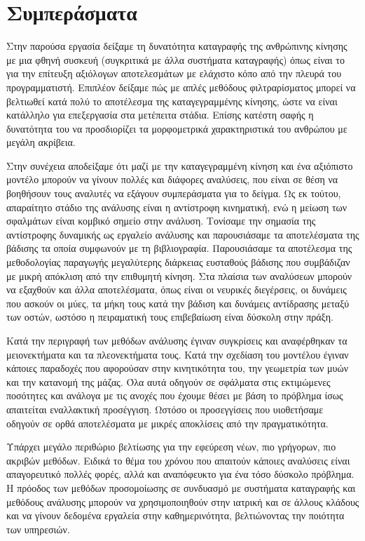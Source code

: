 \section{Συμπεράσματα}

Στην παρούσα εργασία δείξαμε τη δυνατότητα καταγραφής της ανθρώπινης κίνησης με μια φθηνή συσκευή (συγκριτικά με άλλα συστήματα καταγραφής) όπως είναι το  για την επίτευξη αξιόλογων αποτελεσμάτων με ελάχιστο κόπο από την πλευρά του προγραμματιστή. Επιπλέον δείξαμε πώς με απλές μεθόδους φιλτραρίσματος μπορεί να βελτιωθεί κατά πολύ το αποτέλεσμα της καταγεγραμμένης κίνησης, ώστε να είναι κατάλληλο για επεξεργασία στα μετέπειτα στάδια. Επίσης κατέστη σαφής η δυνατότητα του  να προσδιορίζει τα μορφομετρικά χαρακτηριστικά του ανθρώπου με μεγάλη ακρίβεια.

Στην συνέχεια αποδείξαμε ότι μαζί με την καταγεγραμμένη κίνηση και ένα αξιόπιστο μοντέλο μπορούν να γίνουν πολλές και διάφορες αναλύσεις, που είναι σε θέση να βοηθήσουν τους αναλυτές να εξάγουν συμπεράσματα για το δείγμα. Ως εκ τούτου, απαραίτητο στάδιο της ανάλυσης είναι η αντίστροφη κινηματική, ενώ η μείωση των σφαλμάτων είναι κομβικό σημείο στην ανάλυση. Τονίσαμε την σημασία της αντίστροφης δυναμικής ως εργαλείο ανάλυσης και παρουσιάσαμε τα αποτελέσματα της βάδισης τα οποία συμφωνούν με τη βιβλιογραφία. Παρουσιάσαμε τα αποτέλεσμα της μεθοδολογίας παραγωγής μεγαλύτερης διάρκειας ευσταθούς βάδισης που συμβάδιζαν με μικρή απόκλιση από την επιθυμητή κίνηση. Στα πλαίσια των αναλύσεων μπορούν να εξαχθούν και άλλα αποτελέσματα, όπως είναι οι νευρικές διεγέρσεις, οι δυνάμεις που ασκούν οι μύες, τα μήκη τους κατά την βάδιση και δυνάμεις αντίδρασης μεταξύ των οστών, ωστόσο η πειραματική τους επιβεβαίωση είναι δύσκολη στην πράξη.

Κατά την περιγραφή των μεθόδων ανάλυσης έγιναν συγκρίσεις και αναφέρθηκαν τα μειονεκτήματα και τα πλεονεκτήματα τους. Κατά την σχεδίαση του μοντέλου έγιναν κάποιες παραδοχές που αφορούσαν στην κινητικότητα του, την γεωμετρία των μυών και την κατανομή της μάζας. Όλα αυτά οδηγούν σε σφάλματα στις εκτιμώμενες ποσότητες και ανάλογα με τις ανοχές που έχουμε θέσει με βάση το πρόβλημα ίσως απαιτείται εναλλακτική προσέγγιση. Ωστόσο οι προσεγγίσεις που υιοθετήσαμε οδηγούν σε ορθά αποτελέσματα με μικρές αποκλίσεις από την πραγματικότητα.

Υπάρχει μεγάλο περιθώριο βελτίωσης για την εφεύρεση νέων, πιο γρήγορων, πιο ακριβών μεθόδων. Ειδικά το θέμα του χρόνου που απαιτούν κάποιες αναλύσεις είναι απαγορευτικό πολλές φορές, αλλά και αναπόφευκτο για ένα τόσο δύσκολο πρόβλημα. Η πρόοδος των μεθόδων προσομοίωσης σε συνδυασμό με συστήματα καταγραφής και μεθόδους ανάλυσης μπορούν να χρησιμοποιηθούν στην ιατρική και σε άλλους κλάδους και να γίνουν δεδομένα εργαλεία στην καθημερινότητα, βελτιώνοντας την ποιότητα των υπηρεσιών.
